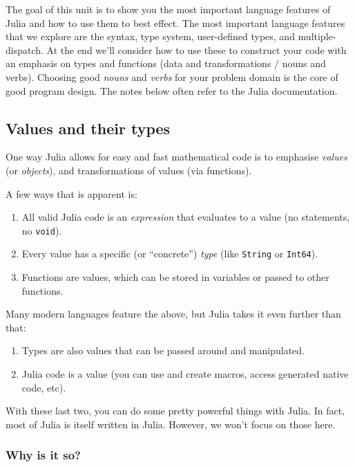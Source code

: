 \documentclass[
]{article}
\providecommand{\tightlist}{%
  \setlength{\itemsep}{0pt}\setlength{\parskip}{0pt}}
\begin{document}
The goal of this unit is to show you the most important language
features of Julia and how to use them to best effect. The most important
language features that we explore are the syntax, type system,
user-defined types, and multiple-dispatch. At the end we'll consider how
to use these to construct your code with an emphasis on types and
functions (data and transformations / nouns and verbs). Choosing good
\emph{nouns} and \emph{verbs} for your problem domain is the core of
good program design. The notes below often refer to the Julia
documentation.

\subsection{Values and their types}\label{values-and-their-types}

One way Julia allows for easy and fast mathematical code is to emphasise
\emph{values} (or \emph{objects}), and transformations of values (via
functions).

A few ways that is apparent is:

\begin{enumerate}
\def\labelenumi{\arabic{enumi}.}
\tightlist
\item
  All valid Julia code is an \emph{expression} that evaluates to a value
  (no statements, no \texttt{void}).
\item
  Every value has a specific (or ``concrete'') \emph{type} (like
  \texttt{String} or \texttt{Int64}).
\item
  Functions are values, which can be stored in variables or passed to
  other functions.
\end{enumerate}

Many modern languages feature the above, but Julia takes it even further
than that:

\begin{enumerate}
\def\labelenumi{\arabic{enumi}.}
\setcounter{enumi}{3}
\tightlist
\item
  Types are also values that can be passed around and manipulated.
\item
  Julia code is a value (you can use and create macros, access generated
  native code, etc).
\end{enumerate}

With these last two, you can do some pretty powerful things with Julia.
In fact, most of Julia is itself written in Julia. However, we won't
focus on those here.

\subsubsection{Why is it so?}\label{why-is-it-so}
\end{document}
